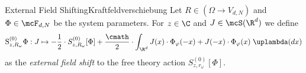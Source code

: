 \begin{mdef}{External Field Shifting}{Kraftfeldverschiebung}
    Let $R\in(\Omega\to V_{d,N})$ and $\Phi\in\mcF_{d,N}$ be the system parameters. For $z\in\C$ and $J\in\mcS(\R^d)$ we define
    \[
        \text{S}_{z,R_\omega}^{(0)}\Phi:J\mapsto -\frac{1}{2}\cdot S_{z,R_\omega}^{(0)}[\Phi] + \frac{\cmath}{2}\cdot\int_{\R^d} J(x)\cdot\Phi_{\varphi}(-x) + J(-x)\cdot\Phi_{\varphi}(x)\;\uplambda(dx)
    \]
    as the \emph{external field shift} to the free theory action $S_{z,r_\omega}^{(0)}[\Phi]$.
\end{mdef}
